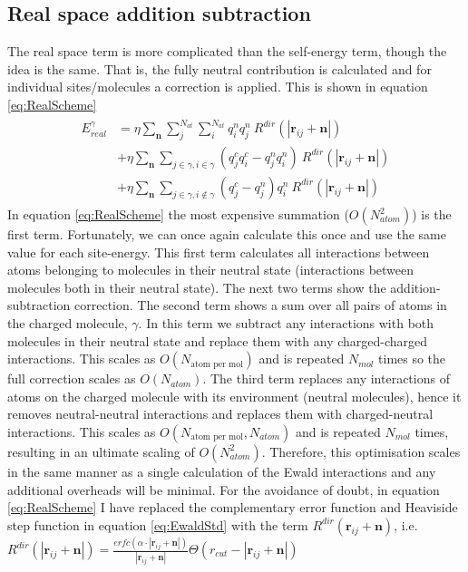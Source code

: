 \subsection{Real space addition subtraction}
The real space term is more complicated than the self-energy term, though the idea is the same. That is, the fully neutral contribution is calculated and for individual sites/molecules a correction is applied. This is shown in equation \eqref{eq:RealScheme}
\begin{align}
  \begin{split}
	  E^{\gamma}_{real} &= \eta \sum_{\mathbf{n}} \sum_{j}^{N_{at}} \sum_{i}^{N_{at}} q^{n}_i q^{n}_j  \ R^{dir}(|\mathbf{r}_{ij} + \mathbf{n}|) \\
	  &+ \eta \sum_{\mathbf{n}} \sum_{j \in \gamma, i \in \gamma} (q_j^c q_i^c - q_j^n q_i^n) \ R^{dir}(|\mathbf{r}_{ij} + \mathbf{n}|) \\
	  &+ \eta \sum_{\mathbf{n}} \sum_{j \in \gamma, i \not\in \gamma} (q_j^c - q_j^n)q_i^n \ R^{dir}(|\mathbf{r}_{ij} + \mathbf{n}|) 
  \end{split}
  \label{eq:RealScheme}
\end{align}
In equation \eqref{eq:RealScheme} the most expensive summation ($O(N_{atom}^2)$) is the first term. Fortunately, we can once again calculate this once and use the same value for each site-energy. This first term calculates all interactions between atoms belonging to molecules in their neutral state (interactions between molecules both in their neutral state). The next two terms show the addition-subtraction correction. The second term shows a sum over all pairs of atoms in the charged molecule, $\gamma$. In this term we subtract any interactions with both molecules in their neutral state and replace them with any charged-charged interactions. This scales as $O(N_{\text{atom per mol}})$ and is repeated $N_{mol}$ times so the full correction scales as $O(N_{atom})$. The third term replaces any interactions of atoms on the charged molecule with its environment (neutral molecules), hence it removes neutral-neutral interactions and replaces them with charged-neutral interactions. This scales as $O(N_{\text{atom per mol}}, N_{atom})$ and is repeated $N_{mol}$ times, resulting in an ultimate scaling of $O(N_{atom}^2)$. Therefore, this optimisation scales in the same manner as a single calculation of the Ewald interactions and any additional overheads will be minimal. For the avoidance of doubt, in equation \eqref{eq:RealScheme} I have replaced the complementary error function and Heaviside step function in equation \eqref{eq:EwaldStd} with the term $R^{dir}(\mathbf{r}_{ij} + \mathbf{n})$, i.e. $R^{dir}(|\mathbf{r}_{ij} + \mathbf{n}|) = \frac{erfc\left( \alpha \cdot |\mathbf{r}_{ij} + \mathbf{n}|\right)}{|\mathbf{r}_{ij} + \mathbf{n}|}              \Theta\left( r_{cut} - |\mathbf{r}_{ij} + \mathbf{n}| \right)$

